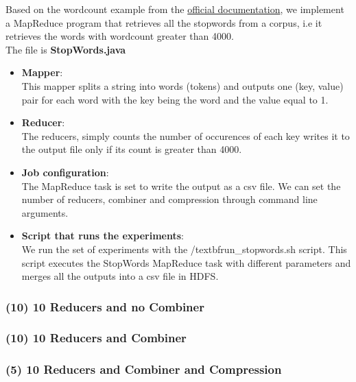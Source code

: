 \documentclass[a4paper,12pt]{article}
\begin{document}
Based on the wordcount example from the \href{https://hadoop.apache.org/docs/stable/hadoop-mapreduce-client/hadoop-mapreduce-client-core/MapReduceTutorial.html}{official documentation},
we implement a MapReduce program that retrieves all the stopwords from a corpus,
i.e it retrieves the words with wordcount greater than 4000.
\\The file is \textbf{StopWords.java}
\begin{itemize}
  \item \textbf{Mapper}:\\
  This mapper splits a string into words (tokens) and outputs one (key, value) pair
  for each word with the key being the word and the value equal to 1.
  
  \item \textbf{Reducer}:\\
  The reducers, simply counts the number of occurences of each key writes it to
  the output file only if its count is greater than 4000.
  
  \item \textbf{Job configuration}:\\
  The MapReduce task is set to write the output as a csv file.
  We can set the number of reducers, combiner and compression through command line
  arguments.
  
  \item \textbf{Script that runs the experiments}:\\
  We run the set of experiments with the /textbf{run_stopwords.sh} script.
  This script executes the StopWords MapReduce task with different parameters
  and merges all the outputs into a csv file in HDFS.
  

\end{itemize}

\subsubsection{(10) 10 Reducers and no Combiner}
\subsubsection{(10) 10 Reducers and Combiner}
\subsubsection{(5) 10 Reducers and Combiner and Compression}
\end{document}
